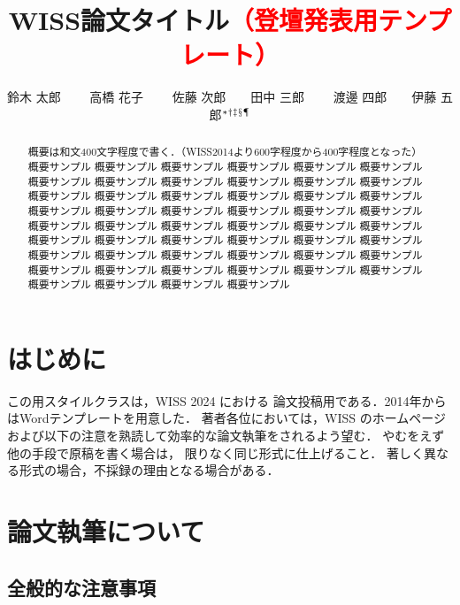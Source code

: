 \documentclass[twoside]{wiss}
\begin{document}
\title{WISS論文タイトル\textcolor{red}{（登壇発表用テンプレート）}}
\etitle{}%
%
%
%
\author{鈴木 太郎 　　高橋 花子
　　佐藤 次郎　　田中 三郎
　　渡邊 四郎　　伊藤 五郎${}^* {}^\dag {}^\ddag {}^\mathsection
{}^\mathparagraph$}

\begin{abstract}
概要は和文400文字程度で書く．（WISS2014より600字程度から400字程度となった）
概要サンプル 概要サンプル 概要サンプル 概要サンプル 概要サンプル 概要サンプル
概要サンプル 概要サンプル 概要サンプル 概要サンプル 概要サンプル 概要サンプル
概要サンプル 概要サンプル 概要サンプル 概要サンプル 概要サンプル 概要サンプル
概要サンプル 概要サンプル 概要サンプル 概要サンプル 概要サンプル 概要サンプル
概要サンプル 概要サンプル 概要サンプル 概要サンプル 概要サンプル 概要サンプル
概要サンプル 概要サンプル 概要サンプル 概要サンプル 概要サンプル 概要サンプル
概要サンプル 概要サンプル 概要サンプル 概要サンプル 概要サンプル 概要サンプル
概要サンプル 概要サンプル 概要サンプル 概要サンプル 概要サンプル 概要サンプル
概要サンプル 概要サンプル 概要サンプル 概要サンプル
\end{abstract}

\maketitle

\section{はじめに}

この\LaTeXe{}用スタイルクラスは，WISS 2024 における
論文投稿用である．2014年からはWordテンプレートを用意した．
著者各位においては，WISS のホームページ\cite{wiss}
および以下の注意を熟読して効率的な論文執筆をされるよう望む．
やむをえず他の手段で原稿を書く場合は，
限りなく同じ形式に仕上げること．
著しく異なる形式の場合，不採録の理由となる場合がある．

\section{論文執筆について}

\subsection{全般的な注意事項}
\end{document}
